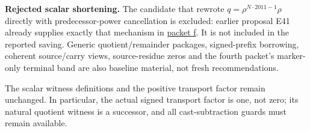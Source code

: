 \textbf{Rejected scalar shortening.} The candidate that rewrote
$q=\rho^{N\cdot2011-1}\rho$ directly with predecessor-power cancellation is excluded: earlier proposal E41 already supplies exactly that mechanism in \href{https://github.com/VladimirReshetnikov/ProveIt/blob/9f35798db4a63c25e435fca14d75931144657d7e/Computability/DiophantineConsistency/research/lean-proof-simplification/2026-10-26f/report/sections/02_local.tex\#L145-L164}{packet f}. It is not included in the reported saving. Generic quotient/remainder packages, signed-prefix borrowing, coherent source/carry views, source-residue zeros and the fourth packet's marker-only terminal band are also baseline material, not fresh recommendations.

The scalar witness definitions and the positive transport factor remain unchanged. In particular, the actual signed transport factor is one, not zero; its natural quotient witness is a successor, and all cast-subtraction guards must remain available.
